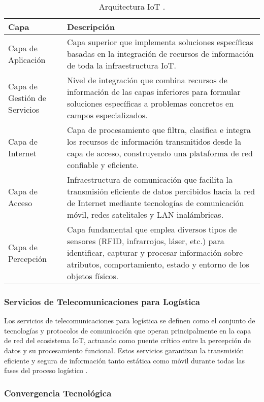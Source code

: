 \begin{table}[H]
\centering
\caption{Arquitectura IoT \cite{Zhou2022}.}
\label{tab:arquitectura_iot}
\begin{tabular}{@{}p{4cm}p{8cm}@{}}
\toprule
\textbf{Capa} & \textbf{Descripción} \\
\midrule
Capa de Aplicación & Capa superior que implementa soluciones específicas basadas en la integración de recursos de información de toda la infraestructura IoT. \\
\addlinespace
Capa de Gestión de Servicios & Nivel de integración que combina recursos de información de las capas inferiores para formular soluciones específicas a problemas concretos en campos especializados. \\
\addlinespace
Capa de Internet & Capa de procesamiento que filtra, clasifica e integra los recursos de información transmitidos desde la capa de acceso, construyendo una plataforma de red confiable y eficiente. \\
\addlinespace
Capa de Acceso & Infraestructura de comunicación que facilita la transmisión eficiente de datos percibidos hacia la red de Internet mediante tecnologías de comunicación móvil, redes satelitales y LAN inalámbricas. \\
\addlinespace
Capa de Percepción & Capa fundamental que emplea diversos tipos de sensores (RFID, infrarrojos, láser, etc.) para identificar, capturar y procesar información sobre atributos, comportamiento, estado y entorno de los objetos físicos. \\
\bottomrule
\end{tabular}
\end{table}

\subsubsection{Servicios de Telecomunicaciones para Logística}

Los servicios de telecomunicaciones para logística se definen como el conjunto de tecnologías y protocolos de comunicación que operan principalmente en la capa de red del ecosistema IoT, actuando como puente crítico entre la percepción de datos y su procesamiento funcional. Estos servicios garantizan la transmisión eficiente y segura de información tanto estática como móvil durante todas las fases del proceso logístico \cite{Zhou2022}.

\subsubsection{Convergencia Tecnológica}

